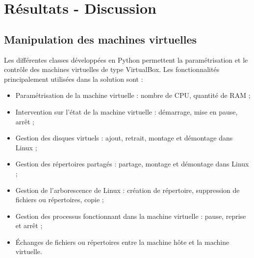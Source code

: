 \cleardoublepage



\chapter{Résultats - Discussion}


\section{Manipulation des machines virtuelles}
\label{Manipulation des machines virtuelles}

Les différentes classes développées en Python permettent la paramétrisation et le contrôle des machines virtuelles de type VirtualBox.
Les fonctionnalités principalement utilisées dans la solution sont :
\begin{itemize}
	\item Paramétrisation de la machine virtuelle : nombre de CPU, quantité de RAM ;
	\item Intervention sur l'état de la machine virtuelle : démarrage, mise en pause, arrêt ;
	\item Gestion des disques virtuels : ajout, retrait, montage et démontage dans Linux ;
	\item Gestion des répertoires partagés : partage, montage et démontage dans Linux ;
	\item Gestion de l'arborescence de Linux : création de répertoire, suppression de fichiers ou répertoires, copie ;
	\item Gestion des processus fonctionnant dans la machine virtuelle : pause, reprise et arrêt ;
	\item Échanges de fichiers ou répertoires entre la machine hôte et la machine virtuelle.
\\
\end{itemize}






